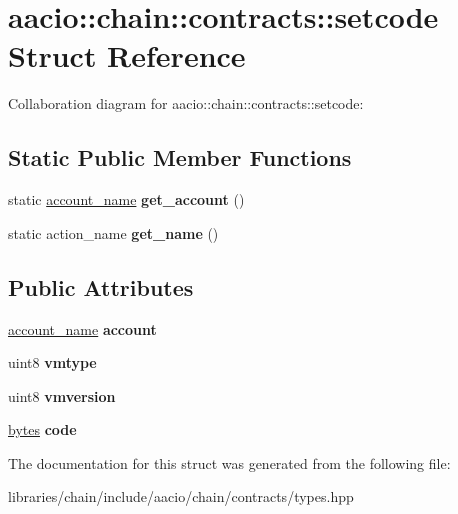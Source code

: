 \hypertarget{structaacio_1_1chain_1_1contracts_1_1setcode}{}\section{aacio\+:\+:chain\+:\+:contracts\+:\+:setcode Struct Reference}
\label{structaacio_1_1chain_1_1contracts_1_1setcode}


Collaboration diagram for aacio\+:\+:chain\+:\+:contracts\+:\+:setcode\+:
\subsection*{Static Public Member Functions}
\begin{DoxyCompactItemize}
\item 
\mbox{\label{structaacio_1_1chain_1_1contracts_1_1setcode_a89c8d6b46a83b20d1af949e8e9469134}} 
static \mbox{\hyperlink{structaacio_1_1chain_1_1name}{account\+\_\+name}} {\bfseries get\+\_\+account} ()
\item 
\mbox{\label{structaacio_1_1chain_1_1contracts_1_1setcode_a4cfb98b1da8b9540b01076a77deb81eb}} 
static action\+\_\+name {\bfseries get\+\_\+name} ()
\end{DoxyCompactItemize}
\subsection*{Public Attributes}
\begin{DoxyCompactItemize}
\item 
\mbox{\label{structaacio_1_1chain_1_1contracts_1_1setcode_a9d64eec1f90af26daae49773f38e9895}} 
\mbox{\hyperlink{structaacio_1_1chain_1_1name}{account\+\_\+name}} {\bfseries account}
\item 
\mbox{\label{structaacio_1_1chain_1_1contracts_1_1setcode_a8f18d3d9c2c4cd825c27b1ffe06f118a}} 
uint8 {\bfseries vmtype}
\item 
\mbox{\label{structaacio_1_1chain_1_1contracts_1_1setcode_a95a82024fe937f4d48f84b105d7827c3}} 
uint8 {\bfseries vmversion}
\item 
\mbox{\label{structaacio_1_1chain_1_1contracts_1_1setcode_ab9f27cd3a662ba2469f5540bd2c9c257}} 
\mbox{\hyperlink{classstd_1_1vector}{bytes}} {\bfseries code}
\end{DoxyCompactItemize}


The documentation for this struct was generated from the following file\+:\begin{DoxyCompactItemize}
\item 
libraries/chain/include/aacio/chain/contracts/types.\+hpp\end{DoxyCompactItemize}
